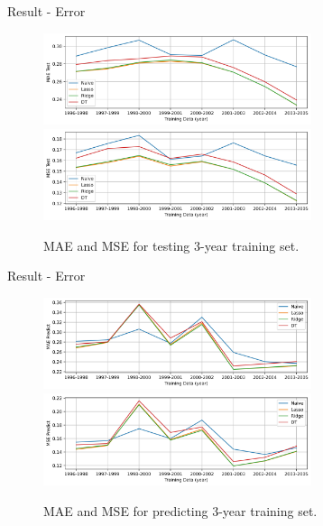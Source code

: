 \documentclass{beamer}
\begin{document}
\begin{frame}{Result - Error}

  \begin{figure}[H]
    \centering
    \includegraphics[width=0.7\textwidth]{../Result/Res-3_MAE_test.jpg} \\
    \includegraphics[width=0.7\textwidth]{../Result/Res-3_MSE_test.jpg}
    \caption{MAE and MSE for testing 3-year training set.}
  \end{figure}

\end{frame}

\begin{frame}{Result - Error}

  \begin{figure}[H]
    \centering
    \includegraphics[width=0.7\textwidth]{../Result/Res-3_MAE_pred.jpg} \\
    \includegraphics[width=0.7\textwidth]{../Result/Res-3_MSE_pred.jpg}
    \caption{MAE and MSE for predicting 3-year training set.}
  \end{figure}

\end{frame}
\end{document}
